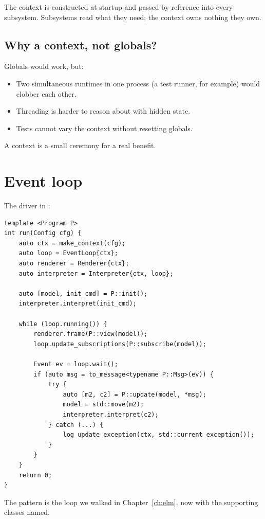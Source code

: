 The context is constructed at startup and passed by reference
into every subsystem. Subsystems read what they need; the
context owns nothing they own.

\subsection*{Why a context, not globals?}

Globals would work, but:

\begin{itemize}[leftmargin=*]
  \item Two simultaneous \maya{} runtimes in one process (a test
    runner, for example) would clobber each other.
  \item Threading is harder to reason about with hidden state.
  \item Tests cannot vary the context without resetting globals.
\end{itemize}

A context is a small ceremony for a real benefit.

\section{Event loop}

The driver in :

\begin{lstlisting}
template <Program P>
int run(Config cfg) {
    auto ctx = make_context(cfg);
    auto loop = EventLoop{ctx};
    auto renderer = Renderer{ctx};
    auto interpreter = Interpreter{ctx, loop};

    auto [model, init_cmd] = P::init();
    interpreter.interpret(init_cmd);

    while (loop.running()) {
        renderer.frame(P::view(model));
        loop.update_subscriptions(P::subscribe(model));

        Event ev = loop.wait();
        if (auto msg = to_message<typename P::Msg>(ev)) {
            try {
                auto [m2, c2] = P::update(model, *msg);
                model = std::move(m2);
                interpreter.interpret(c2);
            } catch (...) {
                log_update_exception(ctx, std::current_exception());
            }
        }
    }
    return 0;
}
\end{lstlisting}

The pattern is the loop we walked in Chapter~\ref{ch:elm}, now
with the supporting classes named.

